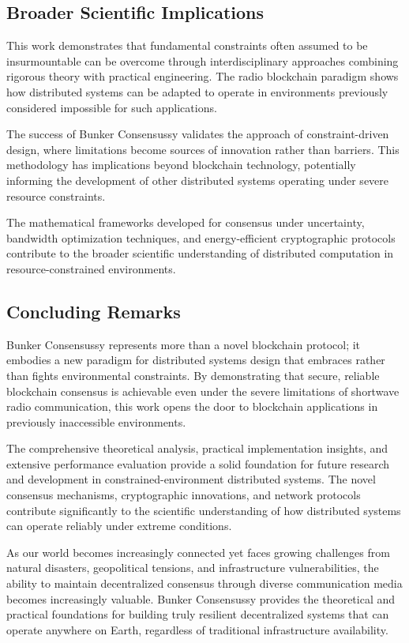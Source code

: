 \documentclass[11pt,a4paper]{article}
\begin{document}
\subsection{Broader Scientific Implications}

This work demonstrates that fundamental constraints often assumed to be insurmountable can be overcome through interdisciplinary approaches combining rigorous theory with practical engineering. The radio blockchain paradigm shows how distributed systems can be adapted to operate in environments previously considered impossible for such applications.

The success of Bunker Consensussy validates the approach of constraint-driven design, where limitations become sources of innovation rather than barriers. This methodology has implications beyond blockchain technology, potentially informing the development of other distributed systems operating under severe resource constraints.

The mathematical frameworks developed for consensus under uncertainty, bandwidth optimization techniques, and energy-efficient cryptographic protocols contribute to the broader scientific understanding of distributed computation in resource-constrained environments.

\subsection{Concluding Remarks}

Bunker Consensussy represents more than a novel blockchain protocol; it embodies a new paradigm for distributed systems design that embraces rather than fights environmental constraints. By demonstrating that secure, reliable blockchain consensus is achievable even under the severe limitations of shortwave radio communication, this work opens the door to blockchain applications in previously inaccessible environments.

The comprehensive theoretical analysis, practical implementation insights, and extensive performance evaluation provide a solid foundation for future research and development in constrained-environment distributed systems. The novel consensus mechanisms, cryptographic innovations, and network protocols contribute significantly to the scientific understanding of how distributed systems can operate reliably under extreme conditions.

As our world becomes increasingly connected yet faces growing challenges from natural disasters, geopolitical tensions, and infrastructure vulnerabilities, the ability to maintain decentralized consensus through diverse communication media becomes increasingly valuable. Bunker Consensussy provides the theoretical and practical foundations for building truly resilient decentralized systems that can operate anywhere on Earth, regardless of traditional infrastructure availability.
\end{document}
